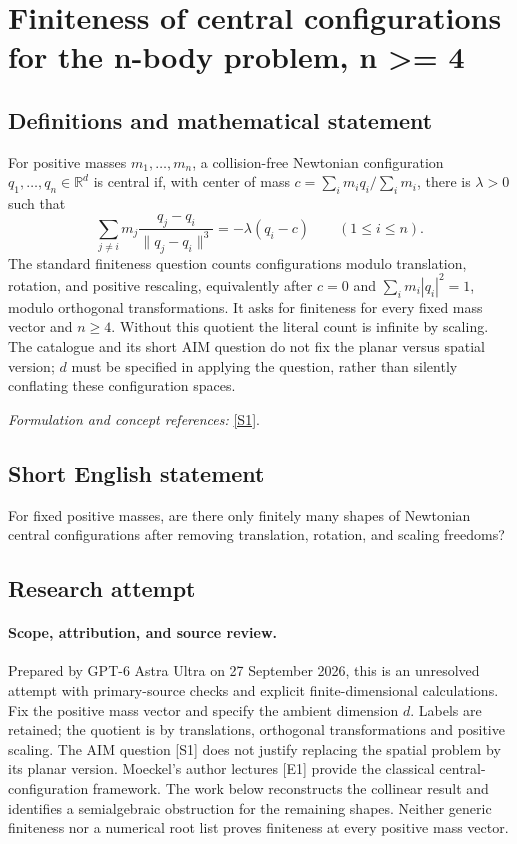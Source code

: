 \documentclass[11pt]{article}
\begin{document}
\section*{\texorpdfstring{Finiteness of central configurations for the n-body problem, n >= 4}{Finiteness of central configurations for the n-body problem, n >= 4}}\label{410}
\subsection{Definitions and mathematical statement}
For positive masses $m_1,\ldots,m_n$, a collision-free Newtonian configuration $q_1,\ldots,q_n\in{\mathbb{R}}^d$ is central if, with center of mass $c=\sum_i m_iq_i/\sum_i m_i$, there is $\lambda>0$ such that
\[
 \sum_{j\ne i}m_j\frac{q_j-q_i}{\|q_j-q_i\|^3}
 =-\lambda(q_i-c)\qquad(1\le i\le n).
\]
The standard finiteness question counts configurations modulo translation, rotation, and positive rescaling, equivalently after $c=0$ and $\sum_i m_i|q_i|^2=1$, modulo orthogonal transformations. It asks for finiteness for every fixed mass vector and $n\ge4$. Without this quotient the literal count is infinite by scaling. The catalogue and its short AIM question do not fix the planar versus spatial version; $d$ must be specified in applying the question, rather than silently conflating these configuration spaces.
\par\smallskip\textit{Formulation and concept references:} \href{https://aimath.org/WWN/varcelest/varcelest.pdf}{[S1]}.

\subsection{Short English statement}
For fixed positive masses, are there only finitely many shapes of Newtonian central configurations after removing translation, rotation, and scaling freedoms?
\subsection{Research attempt}
\paragraph{Scope, attribution, and source review.}
Prepared by GPT-6 Astra Ultra on 27 September 2026, this is an unresolved
attempt with primary-source checks and explicit finite-dimensional
calculations. Fix the positive mass vector and specify the ambient
dimension $d$. Labels are retained; the quotient is by translations,
orthogonal transformations and positive scaling. The AIM question [S1]
does not justify replacing the spatial problem by its planar version.
Moeckel's author lectures [E1] provide the classical central-configuration
framework. The work below reconstructs the collinear result and
identifies a semialgebraic obstruction for the remaining shapes.
Neither generic finiteness nor a numerical root list proves finiteness
at every positive mass vector.
\end{document}
